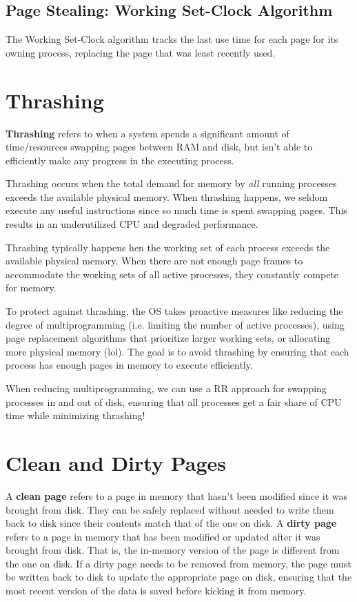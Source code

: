 \documentclass{report}
\newcommand{\definitionBegin}[1]{\begin{tcolorbox}[title={Definition: #1}]}
\newcommand{\definitionEnd}{\end{tcolorbox}}
\newcommand{\exampleBegin}[1]{\begin{tcolorbox}[colback=blue!5!white,colframe=black!75!blue,title={Example:
      #1}]}
\newcommand{\exampleEnd}{\end{tcolorbox}}
\begin{document}
\subsection*{Page Stealing: Working Set-Clock Algorithm}
The Working Set-Clock algorithm tracks the last use time for each page for its owning process,
replacing the page that was least recently used.





\section{Thrashing}
\definitionBegin{Thrashing}
\textbf{Thrashing} refers to when a system spends a significant amount of time/resources swapping
pages between RAM and disk, but isn't able to efficiently make any progress in the executing
process.
\definitionEnd

Thrashing occurs when the total demand for memory by \textit{all} running processes exceeds the
available physical memory. When thrashing happens, we seldom execute any useful instructions since
so much time is spent swapping pages. This results in an underutilized CPU and degraded performance.

Thrashing typically happens hen the working set of each process exceeds the available physical
memory. When there are not enough page frames to accommodate the working sets of all active
processes, they constantly compete for memory.

To protect against thrashing, the OS takes proactive measures like reducing the degree of
multiprogramming (i.e. limiting the number of active processes), using page replacement algorithms
that prioritize larger working sets, or allocating more physical memory (lol). The goal is to avoid
thrashing by ensuring that each process has enough pages in memory to execute efficiently.

\exampleBegin{Everyone Gets a Turn}
When reducing multiprogramming, we can use a RR approach for swapping processes in and out of disk,
ensuring that all processes get a fair share of CPU time while minimizing thrashing!
\exampleEnd





\section{Clean and Dirty Pages}
\definitionBegin{Clean and Dirty Pages}
A \textbf{clean page} refers to a page in memory that hasn't been modified since it was brought from
disk. They can be safely replaced without needed to write them back to disk since their contents
match that of the one on disk.
\tcblower
A \textbf{dirty page} refers to a page in memory that has been modified or updated after it was
brought from disk. That is, the in-memory version of the page is different from the one on disk. If
a dirty page needs to be removed from memory, the page must be written back to disk to update the
appropriate page on disk, ensuring that the most recent version of the data is saved before kicking
it from memory. 
\definitionEnd
\end{document}
